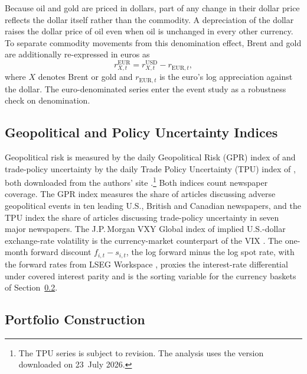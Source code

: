 Because oil and gold are priced in dollars, part of any change in their dollar price reflects the dollar itself rather than the commodity. A depreciation of the dollar raises the dollar price of oil even when oil is unchanged in every other currency. To separate commodity movements from this denomination effect, Brent and gold are additionally re-expressed in euros as
\begin{equation}
  \label{eq:eur_conversion}
  r^{\mathrm{EUR}}_{X,t} = r^{\mathrm{USD}}_{X,t} - r_{\mathrm{EUR},t},
\end{equation}
where $X$ denotes Brent or gold and $r_{\mathrm{EUR},t}$ is the euro's log appreciation against the dollar. The euro-denominated series enter the event study as a robustness check on denomination.

\subsection{Geopolitical and Policy Uncertainty Indices}
\label{sec:data_gpr}

Geopolitical risk is measured by the daily Geopolitical Risk (GPR) index of \textcite{caldara_iacoviello_2022} and trade-policy uncertainty by the daily Trade Policy Uncertainty (TPU) index of \textcite{caldara_etal_2020_tpu}, both downloaded from the authors' site \parencite{ds_gpr,ds_tpu}.\footnote{The TPU series is subject to revision. The analysis uses the version downloaded on 23~July 2026.} Both indices count newspaper coverage. The GPR index measures the share of articles discussing adverse geopolitical events in ten leading U.S., British and Canadian newspapers, and the TPU index the share of articles discussing trade-policy uncertainty in seven major newspapers. The J.P.\,Morgan VXY Global index of implied U.S.-dollar exchange-rate volatility is the currency-market counterpart of the VIX \parencite{ds_lseg_vxy}. The one-month forward discount $f_{i,t}-s_{i,t}$, the log forward minus the log spot rate, with the forward rates from LSEG Workspace \parencite{ds_lseg_fwd}, proxies the interest-rate differential under covered interest parity \parencite{lustig_roussanov_verdelhan_2011} and is the sorting variable for the currency baskets of Section~\ref{sec:data_portfolios}.

\subsection{Portfolio Construction}
\label{sec:data_portfolios}

